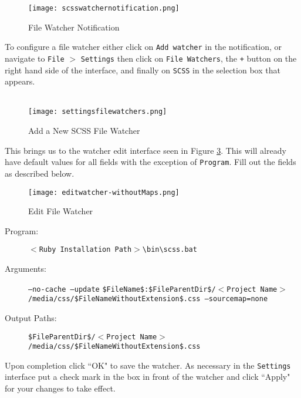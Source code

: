\begin{figure}[h] 
	\centering
	\texttt{[image: scsswatchernotification.png]}
	\caption{File Watcher Notification}
	\label{fig:watchernotification}
\end{figure}

\noindent
To configure a file watcher either click on \texttt{Add watcher} in the notification, or navigate to \texttt{File} $>$ \texttt{Settings} then click on \texttt{File Watchers}, the \texttt{+} button on the right hand side of the interface, and finally on \texttt{SCSS} in the selection box that appears.\\
\\

\begin{figure}[h] 
	\centering
	\texttt{[image: settingsfilewatchers.png]}
	\caption{Add a New SCSS File Watcher}
	\label{fig:addscssfilewatcher}
\end{figure}

\newpage

\noindent
This brings us to the watcher edit interface seen in Figure \ref{fig:watcheredit}. This will already have default values for all fields with the exception of \texttt{Program}. Fill out the fields as described below.\\


\begin{figure}[h] 
	\centering
	\texttt{[image: editwatcher-withoutMaps.png]}
	\caption{Edit File Watcher}
	\label{fig:watcheredit}
\end{figure}

\begin{description}
	\item[Program:] \texttt{$<$Ruby Installation Path$>$\textbackslash bin\textbackslash scss.bat}
	\item[Arguments:] \texttt{--no-cache --update} \newline \texttt{\$FileName\$:\$FileParentDir\$/$<$Project Name$>$/media/css/\$FileNameWithoutExtension\$.css --sourcemap=none}
	\item[Output Paths:] \texttt{\$FileParentDir\$/$<$Project Name$>$/media/css/\$FileNameWithoutExtension\$.css}
\end{description}

\noindent
Upon completion click ``OK" to save the watcher. As necessary in the \texttt{Settings} interface put a check mark in the box in front of the watcher and click ``Apply" for your changes to take effect.

